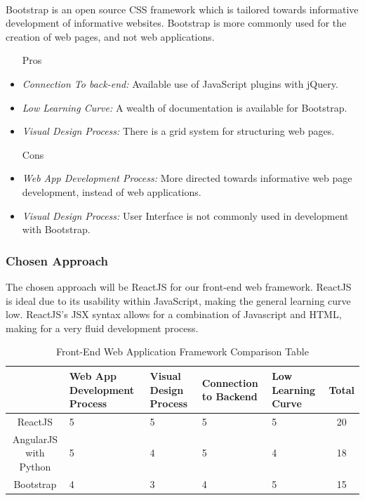 \documentclass[12pt,journal,compsoc]{IEEEtran}
\newenvironment{subs}
  {\adjustwidth{1em}{0pt}}
  {\endadjustwidth}
\begin{document}
\begin{subs}
\begin{subs}
\begin{subs}
\\
Bootstrap is an open source CSS framework which is tailored towards informative development of informative websites. Bootstrap is more commonly used for the creation of web pages, and not web applications. 

\begin{subs}
\begin{itemize}
    \item [{Pros}]
    \item \emph{Connection To back-end:} Available use of JavaScript plugins with jQuery.
    \item \emph{Low Learning Curve:} A wealth of documentation is available for Bootstrap.
    \item \emph{Visual Design Process:} There is a grid system for structuring web pages.
    \item [{Cons}]
    \item \emph{Web App Development Process:} More directed towards informative web page development, instead of web applications.
    \item \emph{Visual Design Process:} User Interface is not commonly used in development with Bootstrap.
\end{itemize}
\end{subs}
\end{subs}

\subsubsection{Chosen Approach}
The chosen approach will be ReactJS for our front-end web framework.  ReactJS is ideal due to its usability within JavaScript, making the general learning curve low. ReactJS’s JSX syntax allows for a combination of Javascript and HTML, making for a very fluid development process.

\begin{table}[H]
\renewcommand{\arraystretch}{1.3}
\caption{Front-End Web Application Framework Comparison Table}
\label{table_4}
\centering
\begin{tabular}{|c||m{8em}|m{8em}|m{8em}|m{8em}||c|}
\hline
&
Web App Development Process
&
Visual Design Process
&
Connection to Backend
&
Low Learning Curve
&
Total\\
\hline
\hline
ReactJS & 5 & 5 & 5 & 5 & 20\\
\hline
AngularJS with Python & 5 & 4 & 5 & 4 & 18\\
\hline
Bootstrap & 4 & 3 & 4 & 5 & 15\\
\hline
\end{tabular}
\end{table}


\end{subs}
\end{subs}
\end{document}
